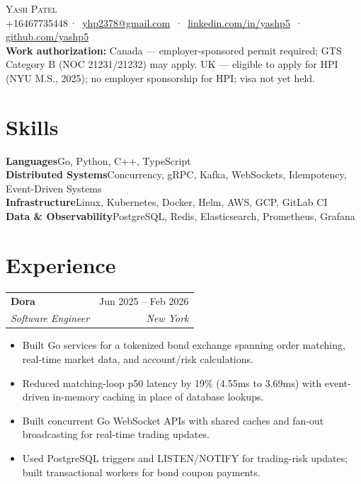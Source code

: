\documentclass[letterpaper,12pt]{article}
\makeatletter
\newcommand{\entry}[4]{%
  \begin{tabularx}{\textwidth}{@{}X@{}r@{}}
    \textbf{#1} & {\small\color{muted}#2} \\
    {\small\itshape #3} & {\small\itshape\color{muted}#4} \\
  \end{tabularx}\vspace{3pt}
}
\newenvironment{bullets}
  {\begin{itemize}[leftmargin=1.1em, itemsep=0pt, topsep=0pt, parsep=0pt, label={\color{muted}\footnotesize\textbullet}]\fontsize{11}{13.0}\selectfont}
  {\end{itemize}\vspace{-3pt}}
\newcommand{\skill}[2]{\textbf{#1}\enspace {\color{muted}·}\enspace #2\\[-1pt]}
\makeatother
\begin{document}
\begin{center}
  {\huge\scshape Yash Patel}\\[1pt]
  {\small
    +16467735448\,{\color{muted}·}\,
    \href{mailto:yhp2378@gmail.com}{yhp2378@gmail.com}
    \,{\color{muted}·}\,
    \href{https://www.linkedin.com/in/yashp5/}{linkedin.com/in/yashp5}
    \,{\color{muted}·}\,
    \href{https://github.com/yashp5}{github.com/yashp5}
  }\\[2pt]
  {\fontsize{9}{10.5}\selectfont\color{muted}
    \textbf{Work authorization:}\enspace
    \ifdefined\CANADA
      Canada --- employer-sponsored permit required; GTS Category B (NOC 21231/21232) may apply.
    \else
      UK --- eligible to apply for HPI (NYU M.S., 2025); no employer sponsorship for HPI; visa not yet held.
    \fi
  }
\end{center}
\vspace{-12pt}

\section{Skills}\vspace{1.2pt}
{\small
\skill{Languages}{Go, Python, C++, TypeScript}
\skill{Distributed Systems}{Concurrency, gRPC, Kafka, WebSockets, Idempotency, Event-Driven Systems}
\skill{Infrastructure}{Linux, Kubernetes, Docker, Helm, AWS, GCP, GitLab CI}
\skill{Data \& Observability}{PostgreSQL, Redis, Elasticsearch, Prometheus, Grafana}
}

\section{Experience}

\entry{Dora}{Jun 2025 -- Feb 2026}{Software Engineer}{New York}
\begin{bullets}
  \item Built Go services for a tokenized bond exchange spanning order matching, real-time market data, and account/risk calculations.
  \item Reduced matching-loop p50 latency by 19\% (4.55ms to 3.69ms) with event-driven in-memory caching in place of database lookups.
  \item Built concurrent Go WebSocket APIs with shared caches and fan-out broadcasting for real-time trading updates.
  \item Used PostgreSQL triggers and LISTEN/NOTIFY for trading-risk updates; built transactional workers for bond coupon payments.
\end{bullets}
\end{document}
